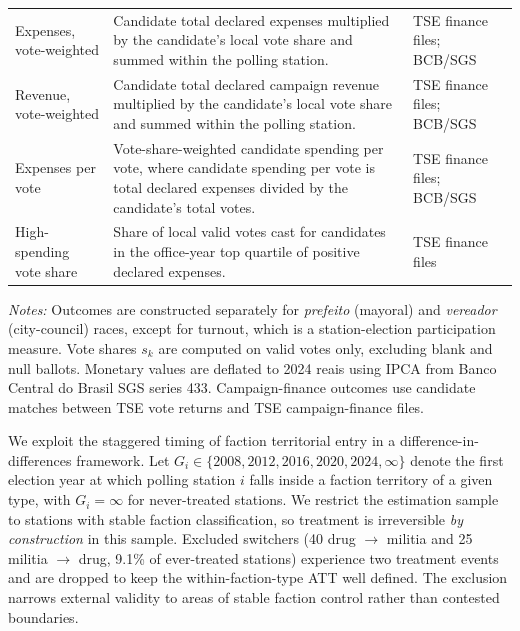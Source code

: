 \documentclass[11pt]{article}
\begin{document}
\begin{table}[H]
\begin{threeparttable}
\begin{tabularx}{\textwidth}{@{}>{\raggedright\arraybackslash}p{}>{\raggedright\arraybackslash}X>{\raggedright\arraybackslash}p{}@{}}
Expenses, vote-weighted & Candidate total declared expenses multiplied by the candidate's local vote share and summed within the polling station. & TSE finance files; BCB/SGS \\[2pt]
Revenue, vote-weighted & Candidate total declared campaign revenue multiplied by the candidate's local vote share and summed within the polling station. & TSE finance files; BCB/SGS \\[2pt]
Expenses per vote & Vote-share-weighted candidate spending per vote, where candidate spending per vote is total declared expenses divided by the candidate's total votes. & TSE finance files; BCB/SGS \\[2pt]
High-spending vote share & Share of local valid votes cast for candidates in the office-year top quartile of positive declared expenses. & TSE finance files \\
\bottomrule
\end{tabularx}
\begin{tablenotes}\footnotesize
\item \textit{Notes:} Outcomes are constructed separately for \emph{prefeito} (mayoral) and \emph{vereador} (city-council) races, except for turnout, which is a station-election participation measure. Vote shares $s_k$ are computed on valid votes only, excluding blank and null ballots. Monetary values are deflated to 2024 reais using IPCA from Banco Central do Brasil SGS series 433. Campaign-finance outcomes use candidate matches between TSE vote returns and TSE campaign-finance files.
\end{tablenotes}
\end{threeparttable}
\end{table}

We exploit the staggered timing of faction territorial entry in a difference-in-differences framework. Let $G_i \in \{2008, 2012, 2016, 2020, 2024, \infty\}$ denote the first election year at which polling station $i$ falls inside a faction territory of a given type, with $G_i = \infty$ for never-treated stations. We restrict the estimation sample to stations with stable faction classification, so treatment is irreversible \emph{by construction} in this sample. Excluded switchers (40 drug $\rightarrow$ militia and 25 militia $\rightarrow$ drug, 9.1\% of ever-treated stations) experience two treatment events and are dropped to keep the within-faction-type ATT well defined. The exclusion narrows external validity to areas of stable faction control rather than contested boundaries.
\end{document}
